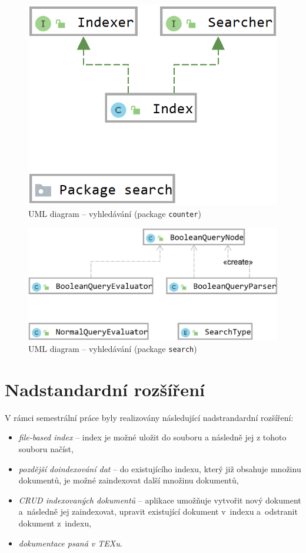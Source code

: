 \documentclass[
11pt,
a4paper,
pdftex,
czech,
titlepage
]{report}
\begin{document}
\begin{figure}[!ht]
	\centering
	\includegraphics[scale=0.30]{img/searching1.png}
	\caption{UML diagram -- vyhledávání (package \texttt{counter})}
	\label{searching1}
\end{figure}

\begin{figure}[!ht]
	\centering
	\includegraphics[scale=0.30]{img/searching2.png}
	\caption{UML diagram -- vyhledávání (package \texttt{search})}
	\label{searching2}
\end{figure}

\section{Nadstandardní rozšíření}
V rámci semestrální práce byly realizovány následující nadstrandardní rozšíření:
\begin{itemize}
    \item \textit{file-based index} -- index je možné uložit do souboru a následně jej z tohoto souboru načíst,
    \item \textit{pozdější doindexování dat} -- do existujícího indexu, který již obsahuje množinu dokumentů, je možné zaindexovat další množinu dokumentů,
    \item \textit{CRUD indexovaných dokumentů} -- aplikace umožňuje vytvořit nový dokument a~následně jej zaindexovat, upravit existující dokument v~indexu a~odstranit dokument z~indexu,
    \item \textit{dokumentace psaná v TEXu}.
\end{itemize}
\end{document}
